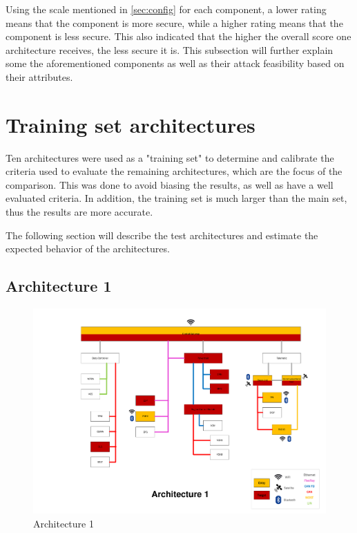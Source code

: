 Using the scale mentioned in \ref{sec:config} for each component, a lower rating means that the component is more secure, while a higher rating means that the component is less secure.
This also indicated that the higher the overall score one architecture receives, the less secure it is.
This subsection will further explain some the aforementioned components as well as their attack feasibility based on their attributes.

    
\section{Training set architectures}
\label{sec:trainingarch}

Ten architectures were used as a "training set" to determine and calibrate the criteria used to 
evaluate the remaining architectures, which are the focus of the comparison.
This was done to avoid biasing the results, as well as have a well evaluated criteria.
In addition, the training set is much larger than the main set, thus the results are more accurate.

The following section will describe the test architectures and estimate the expected behavior of the architectures.

\subsection*{Architecture 1}
\label{sec:arch1}

\begin{figure}[h!]
    \caption{Architecture 1}
    \includegraphics[width=\textwidth, page=1]{../Architectures-survey.pdf}
\end{figure}

